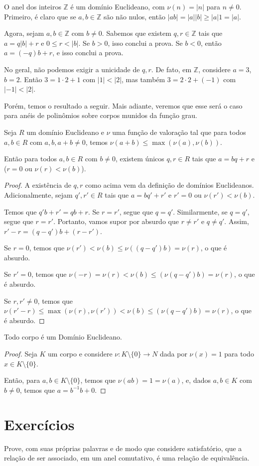 \begin{exemplo}
    O anel dos inteiros $\mathbb Z$ é um domínio Euclideano, com $\nu(n)=|n|$ para $n\neq 0$.
    Primeiro, é claro que se $a, b\in \mathbb Z$ são não nulos, então $|ab|=|a||b|\geq |a|1=|a|$.

    Agora, sejam $a, b\in \mathbb Z$ com $b\neq 0$.
    Sabemos que existem $q, r \in \mathbb Z$ tais que $a=q|b|+r$ e $0\leq r < |b|$.
    Se $b>0$, isso conclui a prova.
    Se $b<0$, então $a=(-q)b+r$, e isso conclui a prova.
\end{exemplo}

\begin{exemplo}
    No geral, não podemos exigir a unicidade de $q, r$.
    De fato, em $\mathbb Z$, considere $a=3$, $b=2$.
    Então $3=1\cdot 2+1$ com $|1|<|2|$, mas também $3=2\cdot 2+(-1)$ com $|-1|<|2|$.
\end{exemplo}

Porém, temos o resultado a seguir.
Mais adiante, veremos que esse será o caso para anéis de polinômios sobre corpos munidos da função grau.


\begin{prop}
    Seja $R$ um domínio Euclideano e $\nu$ uma função de valoração tal que
    para todos $a, b\in R$ com $a, b, a+b\neq 0$, temos $\nu(a+b)\leq \max(\nu(a), \nu(b))$.
    
    Então para todos $a, b \in R$ com $b\neq 0$, existem únicos $q, r \in R$ tais que $a=bq+r$ e ($r=0$ ou $\nu(r)<\nu(b)$).
\end{prop}
\begin{proof}
    A existência de $q, r$ como acima vem da definição de domínios Euclideanos.
    Adicionalmente, sejam $q', r' \in R$ tais que $a=bq'+r'$ e $r'=0$ ou $\nu(r')<\nu(b)$.

    Temos que $q'b+r'=qb+r$.
    Se $r=r'$, segue que $q=q'$.
    Similarmente, se $q=q'$, segue que $r=r'$.
    Portanto, vamos supor por absurdo que $r\neq r'$ e $q\neq q'$.
    Assim, $r'-r=(q-q')b+(r-r')$.
    
    Se $r=0$, temos que $\nu(r')<\nu(b)\leq \nu((q-q')b)=\nu(r)$, o que é absurdo.

    Se $r'=0$, temos que $\nu(-r)=\nu(r)<\nu(b)\leq(\nu(q-q')b)=\nu(r)$, o que é absurdo.
    
    Se $r, r'\neq 0$, temos que $\nu(r'-r)\leq \max(\nu(r), \nu(r'))<\nu(b)\leq(\nu(q-q')b)=\nu(r)$, o que é absurdo.
\end{proof}

\begin{prop}
    Todo corpo é um Domínio Euclideano.
\end{prop}
\begin{proof}
Seja $K$ um corpo e considere $\nu:K\setminus \{0\}\to N$ dada por $\nu(x)=1$ para todo $x\in K\setminus \{0\}$.

    Então, para $a, b \in K\setminus \{0\}$, temos que $\nu(ab)=1=\nu(a)$,
    e, dados $a, b\in K$ com $b\neq 0$, temos que $a=b^{-1}b+0$.
\end{proof}
\section{Exercícios}

\begin{exer}
    Prove, com suas próprias palavras e de modo que considere satisfatório, que a relação de ser associado, em um anel comutativo, é uma relação de equivalência.
\end{exer}
